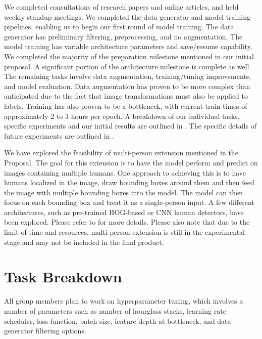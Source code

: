 \documentclass[11pt, letterpaper]{article}
\begin{document}
We completed consultations of research papers and online articles, and held weekly standup meetings. We completed the data generator and model training pipelines, enabling us to begin our first round of model training. The data generator has preliminary filtering, preprocessing, and no augmentation. The model training has variable architecture parameters and save/resume capability. We completed the majority of the preparation milestone mentioned in our initial proposal. A significant portion of the architecture milestone is complete as well. The remaining tasks involve data augmentation, training/tuning improvements, and model evaluation. Data augmentation has proven to be more complex than anticipated due to the fact that image transformations must also be applied to labels. Training has also proven to be a bottleneck, with current train times of approximately 2 to 3 hours per epoch. A breakdown of our individual tasks, specific experiments and our initial results are outlined in . The specific details of future experiments are outlined in . 

We have explored the feasibility of multi-person extension mentioned in the Proposal. The goal for this extension is to have the model perform and predict on images containing multiple humans. One approach to achieving this is to have humans localized in the image, draw bounding boxes around them and then feed the image with multiple bounding boxes into the model. The model can then focus on each bounding box and treat it as a single-person input. A few different architectures, such as pre-trained HOG-based or CNN human detectors, have been explored. Please refer to  for more details. Please also note that due to the limit of time and resources, multi-person extension is still in the experimental stage and may not be included in the final product.


\section{Task Breakdown}
\label{SectionTaskB}

All group members plan to work on hyperparameter tuning, which involves a number of parameters such as number of hourglass stacks, learning rate scheduler, loss function, batch size, feature depth at bottleneck, and data generator filtering options.
\end{document}

